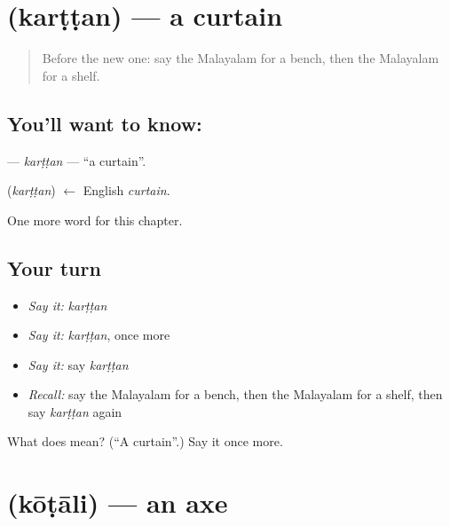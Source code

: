 \section[\texorpdfstring{\ml{കർട്ടൻ} (karṭṭan)}{കർട്ടൻ (karṭṭan)}]{ (karṭṭan) — a curtain}

\label{lesson:ML-C328-karttan}



\begin{quote}
Before the new one: say the Malayalam for a bench, then the Malayalam for a shelf.
\end{quote}

\subsection*{You'll want to know: }
\textbf{} — \emph{karṭṭan} — \textquotedblleft{}a curtain\textquotedblright{}.

\begin{cousinweb}
\textbf{} (\emph{karṭṭan}) $\leftarrow$ English \emph{curtain}.
\end{cousinweb}

\begin{grammarlens}[title={What you've built}]
One more word for this chapter.
\end{grammarlens}

\subsection*{Your turn}
\begin{itemize}
\raggedright
  \item \emph{Say it:} \emph{karṭṭan}
  \item \emph{Say it:} \emph{karṭṭan}, once more
  \item \emph{Say it:} say \emph{karṭṭan}
  \item \emph{Recall:} say the Malayalam for a bench, then the Malayalam for a shelf, then say \emph{karṭṭan} again
\end{itemize}

\begin{tcolorbox}[breakable,colback=teal!4,colframe=teal!35!black,title={Before you move on}]
What does  mean? (\textquotedblleft{}A curtain\textquotedblright{}.) Say it once more.
\end{tcolorbox}
\section[\texorpdfstring{\ml{കോടാലി} (kōṭāli)}{കോടാലി (kōṭāli)}]{ (kōṭāli) — an axe}

